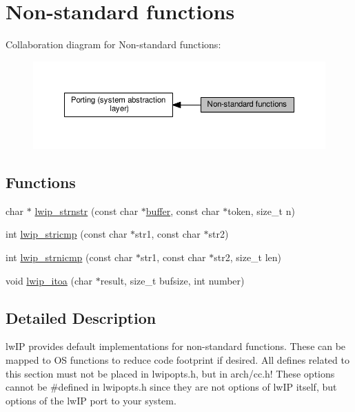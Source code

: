 \hypertarget{group__sys__nonstandard}{}\section{Non-\/standard functions}
\label{group__sys__nonstandard}
Collaboration diagram for Non-\/standard functions\+:
\nopagebreak
\begin{figure}[H]
\begin{center}
\leavevmode
\includegraphics[width=350pt]{group__sys__nonstandard}
\end{center}
\end{figure}
\subsection*{Functions}
\begin{DoxyCompactItemize}
\item 
char $\ast$ \hyperlink{group__sys__nonstandard_gaa2ba4b4e2dd7e1c856fedc6a6069813e}{lwip\+\_\+strnstr} (const char $\ast$\hyperlink{driver__sdcard__spi_2main_8c_a1870d2717147e1356f2eb4e5d5fa4a1c}{buffer}, const char $\ast$token, size\+\_\+t n)
\item 
int \hyperlink{group__sys__nonstandard_ga263cbafcb697eff964139a9998a6668a}{lwip\+\_\+stricmp} (const char $\ast$str1, const char $\ast$str2)
\item 
int \hyperlink{group__sys__nonstandard_ga997dcc49451121d4ed755b33bc7bd26a}{lwip\+\_\+strnicmp} (const char $\ast$str1, const char $\ast$str2, size\+\_\+t len)
\item 
void \hyperlink{group__sys__nonstandard_gaf15b4fbaaae5bb7f6da4301f3f979284}{lwip\+\_\+itoa} (char $\ast$result, size\+\_\+t bufsize, int number)
\end{DoxyCompactItemize}


\subsection{Detailed Description}
lw\+IP provides default implementations for non-\/standard functions. These can be mapped to OS functions to reduce code footprint if desired. All defines related to this section must not be placed in lwipopts.\+h, but in arch/cc.\+h! These options cannot be \#defined in lwipopts.\+h since they are not options of lw\+IP itself, but options of the lw\+IP port to your system. 

